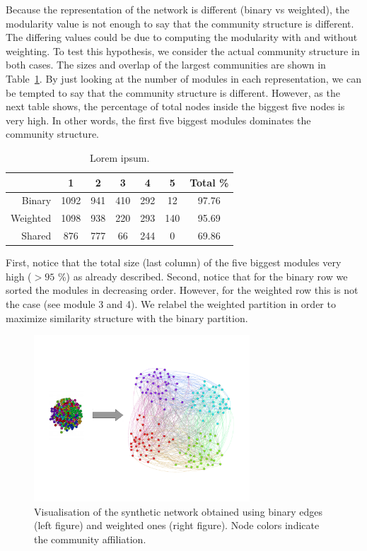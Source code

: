 \documentclass[12pt]{article}
\begin{document}
Because the
representation of the network is different (binary vs weighted),
the modularity value is not enough to say that the community
structure is different. The differing values could be due to computing the modularity with and without weighting. To test this hypothesis, we consider the actual community structure in both cases. The sizes and overlap of the largest communities are shown in Table~\ref{Tab-Community_Stats}. By just looking at the number of modules in each representation,
we can be tempted to say that the community structure is different.
However, as the next table shows, the percentage of total nodes
inside the biggest five nodes is very high. In other words, the
first five biggest modules dominates the community structure.


\begin{table}
\begin{center}
\caption{Lorem ipsum.}
	\begin{tabular}{ | r | c | c | c | c | c | c |}
		\hline
		& 1 & 2 & 3 & 4 & 5 & Total \%\\ \hline
		Binary & 1092 & 941 & 410 & 292 & 12 & 97.76 \\ \hline
		Weighted & 1098 & 938 & 220 & 293 & 140 & 95.69 \\ \hline
		Shared & 876 & 777 & 66 & 244 & 0 & 69.86\label{Tab-Community_Stats} \\ \hline
		
	\end{tabular}
	\end{center}
\end{table}

First, notice that the total size (last column) of the five biggest modules very high ($>95$ \%) as already described. Second, notice
that for the binary row we sorted the modules in decreasing order.
However, for the weighted row this is not the case (see module 3 and 4).
We relabel the weighted partition in order to maximize similarity
structure with the binary partition.

\begin{figure}[!ht]
\centering
\includegraphics[width=0.72\textwidth]{Figures/synthetic_data_networks.pdf}
\caption{Visualisation of the synthetic network obtained using binary edges (left figure) and weighted ones (right figure). Node colors indicate the
community affiliation.}
\label{networks_synthetic}
\end{figure}
\end{document}
